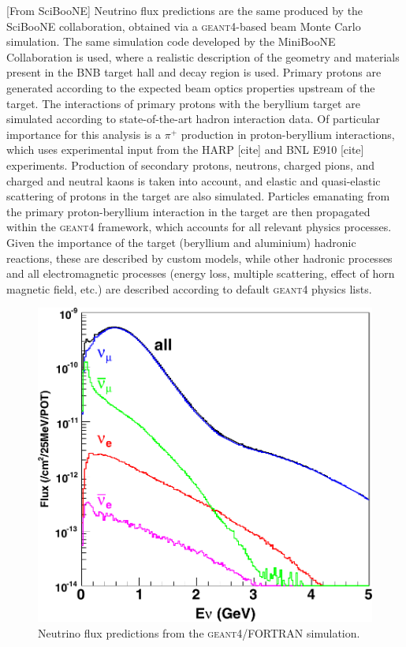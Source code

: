 [From SciBooNE]
 Neutrino flux predictions are the same produced by the SciBooNE collaboration, obtained via a %
 \textsc{geant4}-based beam Monte Carlo simulation.
 The same simulation code developed by the MiniBooNE Collaboration is used, %
 where a realistic description of the geometry and materials present %
 in the BNB target hall and decay region is used.
 Primary protons are generated according to the expected beam optics properties upstream 
 of the target.
 The interactions of primary protons with the beryllium target are simulated according %
 to state-of-the-art hadron interaction data. 
 Of particular importance for this analysis is a $\pi^+$ production in proton-beryllium interactions, %
 which uses experimental input from the HARP [cite] and BNL E910 [cite] experiments. 
 Production of secondary protons, neutrons, charged pions, and charged and neutral %
 kaons is taken into account, and elastic and quasi-elastic scattering of protons in the target %
 are also simulated.
 Particles emanating from the primary proton-beryllium interaction in the target are %
 then propagated within the \textsc{geant4} framework, which accounts for all relevant %
 physics processes. 
 Given the importance of the target (beryllium and aluminium) hadronic reactions, these are %
 described by custom models, while other hadronic processes %
 and all electromagnetic processes (energy loss, multiple scattering, %
 effect of horn magnetic field, etc.) are described according to default \textsc{geant4} physics lists.
 
 \begin{figure}
   \centering
   \includegraphics[scale=0.25]{pics/fluxprediction}
   \caption{Neutrino flux predictions from the \textsc{geant4}/FORTRAN simulation.}
   \label{fig:fluxp}
 \end{figure}
 

